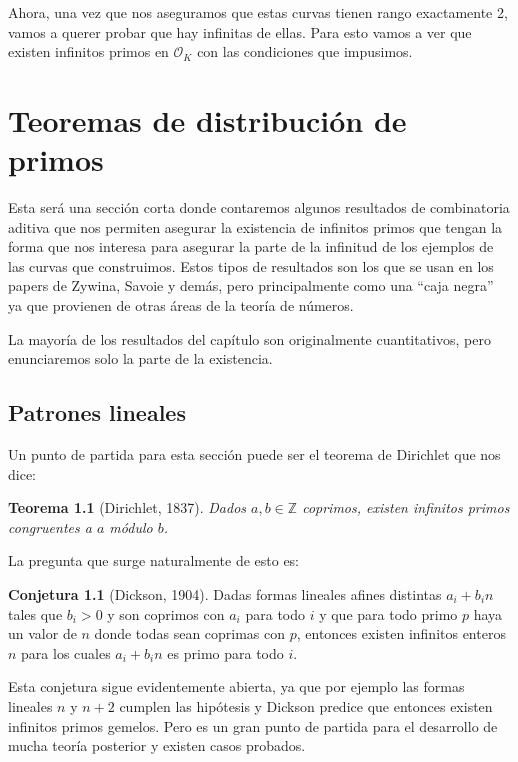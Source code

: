 \documentclass[a4paper]{book}
\theoremstyle{definition}
\newtheorem*{conjecture*}{Conjetura}
\theoremstyle{plain}
\newtheorem*{theorem*}{Teorema}
\newcommand{\ZZ}{\mathbb{Z}}
\newcommand{\OO}{\mathcal{O}}
\begin{document}
Ahora, una vez que nos aseguramos que estas curvas tienen rango exactamente 2, vamos a querer probar que hay infinitas de ellas. Para esto vamos a ver que existen infinitos primos en $\OO_K$ con las condiciones que impusimos.


\chapter{Teoremas de distribución de primos}\label{cap:primos}

Esta será una sección corta donde contaremos algunos resultados de combinatoria aditiva que nos permiten asegurar la existencia de infinitos primos que tengan la forma que nos interesa para asegurar la parte de la infinitud de los ejemplos de las curvas que construimos. Estos tipos de resultados son los que se usan en los papers de Zywina, Savoie y demás, pero principalmente como una ``caja negra'' ya que provienen de otras áreas de la teoría de números.

La mayoría de los resultados del capítulo son originalmente cuantitativos, pero enunciaremos solo la parte de la existencia.

\section{Patrones lineales}

Un punto de partida para esta sección puede ser el teorema de Dirichlet que nos dice:

\begin{theorem*}[Dirichlet, 1837]
Dados $a,b\in\ZZ$ coprimos, existen infinitos primos congruentes a $a$ módulo $b$.
\end{theorem*}

La pregunta que surge naturalmente de esto es:

\begin{conjecture*}[Dickson, 1904]
Dadas formas lineales afines distintas $a_i +b_i n$ tales que $b_i > 0$ y son coprimos con $a_i$ para todo $i$ y que para todo primo $p$ haya un valor de $n$ donde todas sean coprimas con $p$, entonces existen infinitos enteros $n$ para los cuales $a_i+b_i n$ es primo para todo $i$.
\end{conjecture*}
 
Esta conjetura sigue evidentemente abierta, ya que por ejemplo las formas lineales $n$ y $n+2$ cumplen las hipótesis y Dickson predice que entonces existen infinitos primos gemelos. Pero es un gran punto de partida para el desarrollo de mucha teoría posterior y existen casos probados. 
\end{document}
